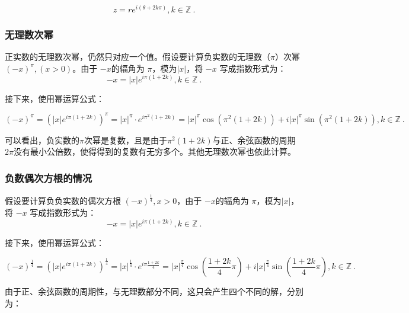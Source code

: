 \begin{equation}
z = r e^{i(\theta+2k\pi)},k\in\mathbb{Z}~.
\end{equation}

\subsubsection{无理数次幂}

正实数的无理数次幂，仍然只对应一个值。假设要计算负实数的无理数（$\pi$）次幂 $(-x)^\pi,(x>0)$。由于 $-x$的辐角为 $\pi$，模为$|x|$，将 $-x$ 写成指数形式为：
\begin{equation}
-x = |x| e^{i\pi(1+2k)},k\in\mathbb{Z}~.
\end{equation}

接下来，使用幂运算公式：

\begin{equation}
(-x)^\pi = \left( |x| e^{i\pi(1+2k)} \right)^\pi =|x|^\pi \cdot e^{i\pi^2(1+2k)}=|x|^\pi\cos(\pi^2(1+2k)) + i|x|^\pi\sin(\pi^2(1+2k)),k\in\mathbb{Z}~.
\end{equation}

可以看出，负实数的$\pi$次幂是复数，且是由于$\pi^2(1+2k)$与正、余弦函数的周期$2\pi$没有最小公倍数，使得得到的复数有无穷多个。其他无理数次幂也依此计算。

\subsubsection{负数偶次方根的情况}

假设要计算负负实数的偶次方根 $(-x)^{\frac{1}{4}},x>0$，由于 $-x$的辐角为 $\pi$，模为$|x|$，将 $-x$ 写成指数形式为：
\begin{equation}
-x = |x| e^{i\pi(1+2k)},k\in\mathbb{Z}~.
\end{equation}

接下来，使用幂运算公式：

\begin{equation}
\displaystyle
(-x)^{\frac{1}{4}} = \left( |x| e^{i\pi(1+2k)} \right)^{\frac{1}{4}} =|x|^{\frac{1}{4}} \cdot e^{i\pi\frac{1+2k}{4}}=|x|^{\frac{\pi}{4}}\cos(\frac{1+2k}{4}\pi) + i|x|^{\frac{\pi}{4}}\sin(\frac{1+2k}{4}\pi),k\in\mathbb{Z}~.
\end{equation}

由于正、余弦函数的周期性，与无理数部分不同，这只会产生四个不同的解，分别为：

